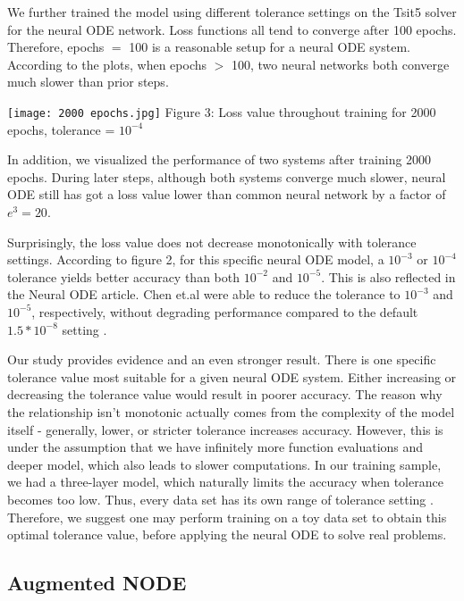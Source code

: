 \documentclass{article}
\begin{document}
We further trained the model using different tolerance settings on the Tsit5 solver for the neural ODE network. Loss functions all tend to converge after 100 epochs. Therefore, epochs $=$ 100 is a reasonable setup for a neural ODE system. According to the plots, when epochs $>$ 100, two neural networks both converge much slower than prior steps. 

\begin{center}
    \texttt{[image: 2000 epochs.jpg]}
    Figure 3: Loss value throughout training for 2000 epochs, tolerance = $10^{-4}$
\end{center}

In addition, we visualized the performance of two systems after training 2000 epochs. During later steps, although both systems converge much slower, neural ODE still has got a loss value lower than common neural network by a factor of $e^3 = 20$.

Surprisingly, the loss value does not decrease monotonically with tolerance settings. According to figure 2, for this specific neural ODE model, a $10^{-3}$ or $10^{-4}$ tolerance yields better accuracy than both $10^{-2}$ and $10^{-5}$. This is also reflected in the Neural ODE article. Chen et.al were able to reduce the tolerance to $10^{-3}$ and $10^{-5}$, respectively, without degrading performance compared to the default $1.5*10^{-8}$ setting \cite{chen2019neural}. 

Our study provides evidence and an even stronger result. There is one specific tolerance value most suitable for a given neural ODE system. Either increasing or decreasing the tolerance value would result in poorer accuracy. The reason why the relationship isn't monotonic actually comes from the complexity of the model itself - generally, lower, or stricter tolerance increases accuracy. However, this is under the assumption that we have infinitely more function evaluations and deeper model, which also leads to slower computations. In our training sample, we had a three-layer model, which naturally limits the accuracy when tolerance becomes too low. Thus, every data set has its own range of tolerance setting \cite{NeuralODEforecast}. Therefore, we suggest one may perform training on a toy data set to obtain this optimal tolerance value, before applying the neural ODE to solve real problems.

\subsection{Augmented NODE}
\end{document}
